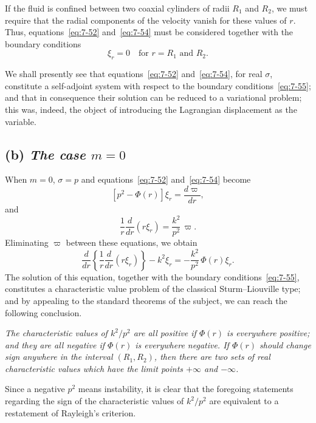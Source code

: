 If the fluid is confined between two coaxial cylinders of radii $R_1$ and
$R_2$, we must require that the radial components of the velocity vanish
for these values of $r$.  Thus, equations~\eqref{eq:7-52} and~\eqref{eq:7-54} must be considered
together with the boundary conditions
\begin{equation}
\label{eq:7-55}
\xi_r = 0 \quad \text{for } r = R_1 \text{ and } R_2.
\end{equation}

We shall presently see that equations~\eqref{eq:7-52} and~\eqref{eq:7-54}, for real $\sigma$, constitute a self-adjoint system with respect to the boundary conditions~\eqref{eq:7-55}; and that in consequence their solution can be reduced to a variational problem; this was, indeed, the object of introducing the Lagrangian
displacement as the variable.

\subsection*{(b) \emph{The case $m = 0$}}
When $m = 0$, $\sigma = p$ and equations~\eqref{eq:7-52} and~\eqref{eq:7-54} become
\begin{equation}
\label{eq:7-56}
[p^2 - \Phi(r)]\xi_r = \frac{d\varpi}{dr},
\end{equation}
and
\begin{equation}
\label{eq:7-57}
\frac{1}{r}\frac{d}{dr}(r\xi_r) = \frac{k^2}{p^2}\,\varpi.
\end{equation}
Eliminating $\varpi$ between these equations, we obtain
\begin{equation}
\label{eq:7-58}
\frac{d}{dr}\!\left\{
\frac{1}{r}\frac{d}{dr}(r\xi_r)\right\}
- k^2\xi_r = -\frac{k^2}{p^2}\,\Phi(r)\xi_r.
\end{equation}
The solution of this equation, together with the boundary conditions~\eqref{eq:7-55},
constitutes a characteristic value problem of the classical Sturm--Liouville type; and by appealing to the standard theorems of the subject,
we can reach the following conclusion.

\emph{The characteristic values of $k^2\!/p^2$ are all positive if $\Phi(r)$ is everywhere
positive; and they are all negative if $\Phi(r)$ is everywhere negative.  If $\Phi(r)$
should change sign anywhere in the interval $(R_1, R_2)$, then there are two
sets of real characteristic values which have the limit points $+\infty$ and $-\infty$.}

Since a negative $p^2$ means instability, it is clear that the foregoing
statements regarding the sign of the characteristic values of $k^2\!/p^2$ are
equivalent to a restatement of Rayleigh's criterion.

